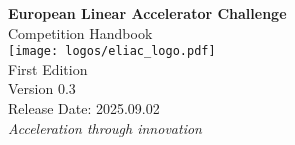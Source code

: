 
\begin{titlepage}
    \centering
    \vspace*{2cm}
    {\Huge\bfseries European Linear Accelerator Challenge\\[0.5cm]}
    {\LARGE Competition Handbook\\[2cm]}
    \texttt{[image: logos/eliac\_logo.pdf]}\\[2cm]
    {\Large First Edition\\[2cm]}
    {\Large Version 0.3\\[0.5cm]}
    {\large Release Date: 2025.09.02\\[2cm]}
    \vfill
    {\large\textit{Acceleration through innovation}}\\[0.5cm]
\end{titlepage}
